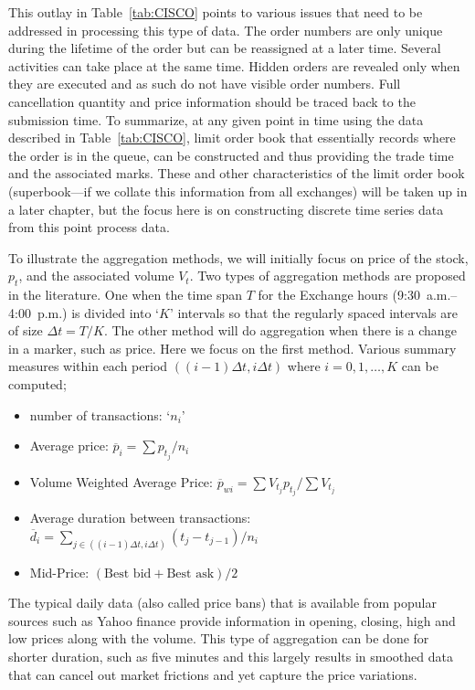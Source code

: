 This outlay in Table~\ref{tab:CISCO} points to various issues that need to be addressed in processing this type of data. The order numbers are only unique during the lifetime of the order but can be reassigned at a later time. Several activities can take place at the same time. Hidden orders are revealed only when they are executed and as such do not have visible order numbers. Full cancellation quantity and price information should be traced back to the submission time. To summarize, at any given point in time using the data described in Table~\ref{tab:CISCO}, limit order book that essentially records where the order is in the queue, can be constructed and thus providing the trade time and the associated marks. These and other characteristics of the limit order book (superbook---if we collate this information from all exchanges) will be taken up in a later chapter, but the focus here is on constructing discrete time series data from this point process data. 


To illustrate the aggregation methods, we will initially focus on price of the stock, $p_t$, and the associated volume $V_{t}$. Two types of aggregation methods are proposed in the literature. One when the time span $T$ for the Exchange hours (9:30~a.m.--4:00~p.m.) is divided into `$K$' intervals so that the regularly spaced intervals are of size $\Delta t = T/K$. The other method will do aggregation when there is a change in a marker, such as price. Here we focus on the first method. Various summary measures within each period $((i - 1)\Delta t, i\Delta t)$ where $i = 0,1,\ldots,K$ can be computed;
\begin{itemize}
\item number of transactions: `$n_i$'
\item Average price: $\overline{p}_i = \sum p_{t_j}/n_i$
\item Volume Weighted Average Price: $\overline{p}_{wi} = \sum V_{t_j}p_{t_j}/\sum V_{t_j}$
\item Average duration between transactions: $\overline{d}_i = \sum_{j\in ((i-1)\Delta t,i\Delta t) }(t_j - t_{j-1})/n_i$
\item Mid-Price: $(\text{Best bid}+\text{Best ask})/2$
\end{itemize}


The typical daily data (also called price bans) that is available from popular sources such as Yahoo finance provide information in opening, closing, high and low prices along with the volume. This type of aggregation can be done for shorter duration, such as five minutes and this largely results in smoothed data that can cancel out market frictions and yet capture the price variations. 


